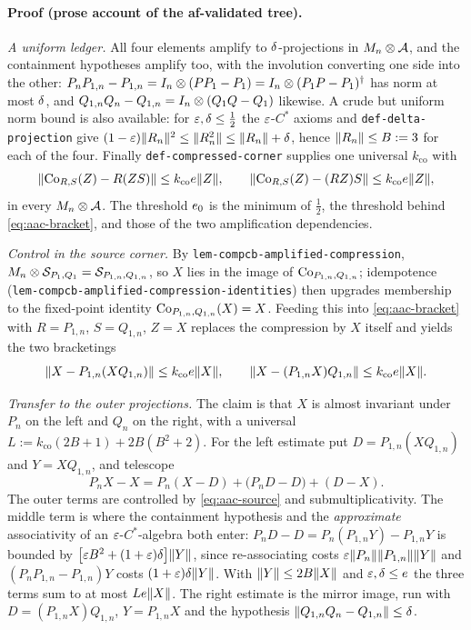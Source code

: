 \paragraph{Proof (prose account of the af-validated tree).}
\emph{A uniform ledger.} All four elements amplify to $\delta$-projections in
$M_{n}\otimes \mathcal A$, and the containment hypotheses amplify too, with the involution
converting one side into the other:
$P_nP_{1,n}-P_{1,n}=I_{n}\otimes (PP_1-P_1)=I_{n}\otimes (P_1P-P_1)^{\dagger}$ has norm at most
$\delta$, and $Q_{1,n}Q_n-Q_{1,n}=I_{n}\otimes (Q_1Q-Q_1)$ likewise. A crude but uniform
norm bound is also available: for $\varepsilon,\delta\le\tfrac12$ the $\varepsilon$-$C^*$ axioms and
\texttt{def-delta-projection} give
$(1-\varepsilon)\lVert R_n\rVert^2\le\lVert R_n^2\rVert\le\lVert R_n\rVert+\delta$, hence $\lVert R_n\rVert\le B:=3$ for each
of the four. Finally \texttt{def-compressed-corner} supplies one universal
$k_{\mathrm{co}}$ with
\begin{equation}\label{eq:aac-bracket}
  \lVert \mathrm{Co}_{R,S}(Z)-R(ZS)\rVert\le k_{\mathrm{co}}e\lVert Z\rVert,
  \qquad
  \lVert \mathrm{Co}_{R,S}(Z)-(RZ)S\rVert\le k_{\mathrm{co}}e\lVert Z\rVert,
\end{equation}
in every $M_{n}\otimes \mathcal A$. The threshold $e_0$ is the minimum of $\tfrac12$, the
threshold behind \eqref{eq:aac-bracket}, and those of the two amplification dependencies.

\emph{Control in the source corner.} By \texttt{lem-compcb-amplified-compression},
$M_{n}\otimes \mathcal S_{P_1,Q_1}=\mathcal S_{P_{1,n},Q_{1,n}}$, so $X$ lies in the image of
$\mathrm{Co}_{P_{1,n},Q_{1,n}}$; idempotence
(\texttt{lem-compcb-amplified-compression-identities}) then upgrades membership to the
fixed-point identity $\mathrm{Co}_{P_{1,n},Q_{1,n}}(X)=X$. Feeding this into
\eqref{eq:aac-bracket} with $R=P_{1,n}$, $S=Q_{1,n}$, $Z=X$ replaces the compression by
$X$ itself and yields the two bracketings
\begin{equation}\label{eq:aac-source}
  \lVert X-P_{1,n}(XQ_{1,n})\rVert\le k_{\mathrm{co}}e\lVert X\rVert,
  \qquad
  \lVert X-(P_{1,n}X)Q_{1,n}\rVert\le k_{\mathrm{co}}e\lVert X\rVert.
\end{equation}

\emph{Transfer to the outer projections.} The claim is that $X$ is almost invariant under
$P_n$ on the left and $Q_n$ on the right, with a universal
$L:=k_{\mathrm{co}}(2B+1)+2B(B^2+2)$. For the left estimate put $D=P_{1,n}(XQ_{1,n})$ and
$Y=XQ_{1,n}$, and telescope
\[
  P_nX-X=P_n(X-D)+\bigl(P_nD-D\bigr)+(D-X).
\]
The outer terms are controlled by \eqref{eq:aac-source} and submultiplicativity. The
middle term is where the containment hypothesis and the \emph{approximate}
associativity of an $\varepsilon$-$C^*$-algebra both enter: $P_nD-D=P_n(P_{1,n}Y)-P_{1,n}Y$ is
bounded by $\bigl[\varepsilon B^2+(1+\varepsilon)\delta\bigr]\lVert Y\rVert$, since re-associating costs
$\varepsilon\lVert P_n\rVert\lVert P_{1,n}\rVert\lVert Y\rVert$ and $(P_nP_{1,n}-P_{1,n})Y$ costs
$(1+\varepsilon)\delta\lVert Y\rVert$. With $\lVert Y\rVert\le2B\lVert X\rVert$ and $\varepsilon,\delta\le e$ the three
terms sum to at most $Le\lVert X\rVert$. The right estimate is the mirror image, run with
$D=(P_{1,n}X)Q_{1,n}$, $Y=P_{1,n}X$ and the hypothesis
$\lVert Q_{1,n}Q_n-Q_{1,n}\rVert\le\delta$.


